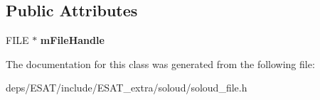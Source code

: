 \subsection*{Public Attributes}
\begin{DoxyCompactItemize}
\item 
\mbox{\label{class_so_loud_1_1_disk_file_a310c115f8d717792fc5c242095dc532d}} 
F\+I\+LE $\ast$ {\bfseries m\+File\+Handle}
\end{DoxyCompactItemize}


The documentation for this class was generated from the following file\+:\begin{DoxyCompactItemize}
\item 
deps/\+E\+S\+A\+T/include/\+E\+S\+A\+T\+\_\+extra/soloud/soloud\+\_\+file.\+h\end{DoxyCompactItemize}
